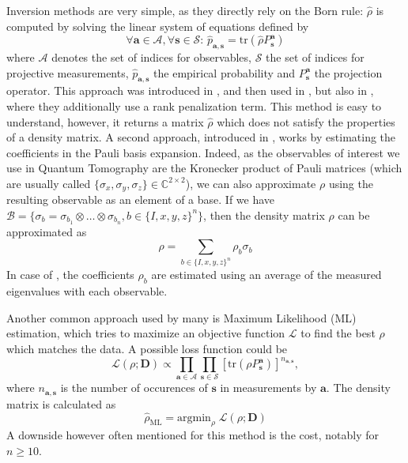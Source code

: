 \documentclass[12pt]{memoir}
\newcommand{\tr}{\text{tr}}
\newcommand{\mb}{\mathbf}
\begin{document}
Inversion methods are very simple, as they directly rely on the Born rule: $\hat \rho$ is computed by solving the linear system of equations defined by 
\begin{equation*} \label{eq:inversion-method}
        \forall \mb a \in \mathcal{A},\forall \mb s \in \mathcal{S}: \, \hat p_{\mb a, \mb s} = \tr(\hat \rho P^{\mb a}_{\mb s})
\end{equation*}
where $\mathcal{A}$ denotes the set of indices for observables, $\mathcal{S}$ the set of indices for projective measurements, $\hat p_{\mb a,\mb s}$ the empirical probability and $P^{\mb a}_{\mb s}$ the projection operator. This approach was introduced in \cite{meth:linear-inversion:vogel-risken}, and then used in \cite{meth:linear-inversion:RMH}, but also in \cite{meth:linear-inversion:alquier}, where they additionally use a rank penalization term. This method is easy to understand, however, it returns a matrix $\hat \rho$ which does not satisfy the properties of a density matrix.\medbreak
A second approach, introduced in \cite{Cai-2016}, works by estimating the coefficients in the Pauli basis expansion. Indeed, as the observables of interest we use in Quantum Tomography are the Kronecker product of Pauli matrices (which are usually called $\{\sigma_x, \sigma_y, \sigma_z\} \in \mathbb{C}^{2\times 2}$), we can also approximate $\rho$ using the resulting observable as an element of a base. If we have $\mathcal{B} = \{\sigma_b = \sigma_{b_1} \otimes \dots \otimes \sigma_{b_n}, b \in \{I,x,y,z\}^n\}$, then the density matrix $\rho$ can be approximated as 
\begin{equation}
    \rho = \sum_{b\in\{I,x,y,z\}^n} \rho_b \sigma_b
\end{equation}
In case of \cite{Cai-2016}, the coefficients $\rho_b$ are estimated using an average of the measured eigenvalues with each observable.\medbreak

Another common approach used by many \cite{Guta20,meth:ML:BDP,meth:ML:JKMW,meth:ML:Lvovsky,meth:ML:Blume-Kohout,meth:ML:Suzuki,meth:ML:Hradil2004} is Maximum Likelihood (ML) estimation, which tries to maximize an objective function $\mathcal{L}$ to find the best $\rho$ which matches the data. A possible loss function could be 
\begin{equation}
\mathcal{L}(\rho ; \mb{D}) \propto \prod_{\mb a \in \mathcal{A}} \prod_{\mb s \in \mathcal{S}}\left[\tr\left(\rho P_{\mb{s}}^{\mb{a}}\right)\right]^{n_{{\mb a}, {\mb s}}},
\end{equation}
where $n_{\mb a,\mb s}$ is the number of occurences of $\mb s$ in measurements by $\mb a$. The density matrix is calculated as 
\begin{equation}
    \hat \rho_{\text{ML}} = \text{argmin}_{\rho} \;\mathcal{L}(\rho;\mb{D})
\end{equation}
A downside however often mentioned for this method is the cost, notably for $n\geq10$.
\medbreak
\end{document}
